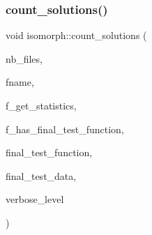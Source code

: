\subsubsection{\texorpdfstring{count\+\_\+solutions()}{count\_solutions()}}
{\footnotesize\ttfamily void isomorph\+::count\+\_\+solutions (\begin{DoxyParamCaption}\item[{\mbox{\hyperlink{galois_8h_a09fddde158a3a20bd2dcadb609de11dc}{I\+NT}}}]{nb\+\_\+files,  }\item[{const \mbox{\hyperlink{galois_8h_ab6cc7b4aeb6ea31aba2b3fbfc83ff5e6}{B\+Y\+TE}} $\ast$$\ast$}]{fname,  }\item[{\mbox{\hyperlink{galois_8h_a09fddde158a3a20bd2dcadb609de11dc}{I\+NT}}}]{f\+\_\+get\+\_\+statistics,  }\item[{\mbox{\hyperlink{galois_8h_a09fddde158a3a20bd2dcadb609de11dc}{I\+NT}}}]{f\+\_\+has\+\_\+final\+\_\+test\+\_\+function,  }\item[{\mbox{\hyperlink{galois_8h_a09fddde158a3a20bd2dcadb609de11dc}{I\+NT}}($\ast$)(\mbox{\hyperlink{galois_8h_a09fddde158a3a20bd2dcadb609de11dc}{I\+NT}} $\ast$data, \mbox{\hyperlink{galois_8h_a09fddde158a3a20bd2dcadb609de11dc}{I\+NT}} sz, void $\ast$final\+\_\+test\+\_\+data, \mbox{\hyperlink{galois_8h_a09fddde158a3a20bd2dcadb609de11dc}{I\+NT}} \mbox{\hyperlink{simeon_8_c_a818073fbcc2f439e7c56952f67386122}{verbose\+\_\+level}})}]{final\+\_\+test\+\_\+function,  }\item[{void $\ast$}]{final\+\_\+test\+\_\+data,  }\item[{\mbox{\hyperlink{galois_8h_a09fddde158a3a20bd2dcadb609de11dc}{I\+NT}}}]{verbose\+\_\+level }\end{DoxyParamCaption})}

\mbox{\label{classisomorph_af4188dae2ed875b1e5ba95ee8b3624aa}} 
